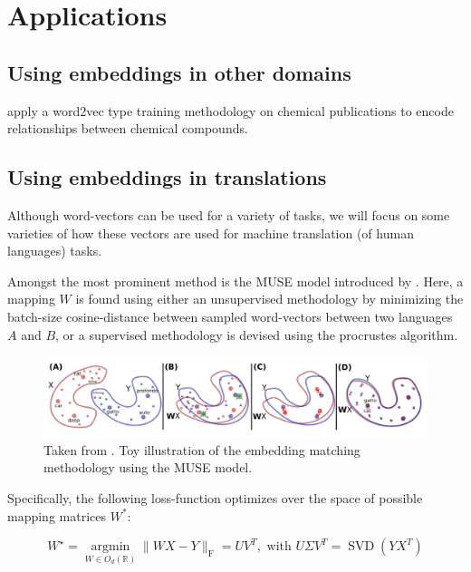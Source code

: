 \documentclass[a4paper,12pt,oneside,openright]{report}
\begin{document}
\chapter{Applications}\label{AppendixApplication}

\section{Using embeddings in other domains}

\cite{tshitoyan19} apply a word2vec type training methodology on chemical publications to encode relationships between chemical compounds.


\section{Using embeddings in translations}


Although word-vectors can be used for a variety of tasks, we will focus on some varieties of how these vectors are used for machine translation (of human languages) tasks.

Amongst the most prominent method is the MUSE model introduced by \cite{conneau17}.
Here, a mapping $W$ is found using either an unsupervised methodology by minimizing the batch-size cosine-distance between sampled word-vectors between two languages $A$ and $B$, or a supervised methodology is devised using the procrustes algorithm.

\begin{figure}[h]
	\center
  \includegraphics[width=\linewidth]{./assets/relatedwork/muse.png}
  \caption{Taken from \cite{conneau17}. Toy illustration of the embedding matching methodology using the MUSE model.}
  \label{fig:muse_translation}
\end{figure}

Specifically, the following loss-function optimizes over the space of possible mapping matrices $W^*$:

\begin{equation}
W^{\star}=\underset{W \in O_{d}(\mathbb{R})}{\operatorname{argmin}}\|W X-Y\|_{\mathrm{F}}=U V^{T}, \text { with } U \Sigma V^{T}=\operatorname{SVD}\left(Y X^{T}\right)
\end{equation}
\end{document}
